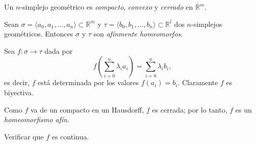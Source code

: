 \begin{nota}
Un $n$-simplejo geométrico es \textit{compacto}, \textit{convexo} y \textit{cerrado} en $\mathbb{R}^m$.
\end{nota}

\begin{prop}
Sean $\sigma = \langle a_0, a_1, \dots, a_n \rangle \subset \mathbb{R}^m$ y $\tau = \langle b_0, b_1, \dots, b_n \rangle \subset \mathbb{R}^l$ dos $n$-simplejos geométricos. Entonces $\sigma$ y $\tau$ son \textit{afínmente homeomorfos}.
\end{prop}

\begin{dem}
Sea $f \colon \sigma \to \tau$ dada por
\[
f\left( \sum_{i=0}^n \lambda_i a_i \right) = \sum_{i=0}^n \lambda_i b_i,
\]
es decir, $f$ está determinada por los valores $f(a_i) = b_i$. Claramente $f$ es biyectiva.

Como $f$ va de un compacto en un Hausdorff, $f$ es cerrada; por lo tanto, $f$ es un \textit{homeomorfismo afín}.
\end{dem}
\begin{ejercicio}
Verificar que $f$ es continua.
\end{ejercicio}

